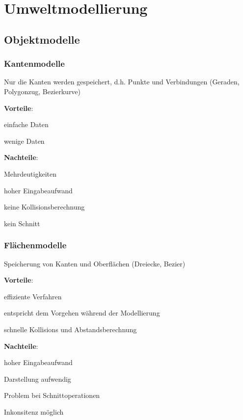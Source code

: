 \chapter{Umweltmodellierung}

\section{Objektmodelle}
\subsection{Kantenmodelle}
\begin{compactitem}
    \item Nur die Kanten werden gespeichert, d.h. Punkte und Verbindungen (Geraden, Polygonzug, Bezierkurve)
    \item \textbf{Vorteile}:
    \begin{compactitem}
        \item einfache Daten
        \item wenige Daten
    \end{compactitem}
    \item \textbf{Nachteile}:
    \begin{compactitem}
        \item Mehrdeutigkeiten
        \item hoher Eingabeaufwand
        \item keine Kollisionsberechnung
        \item kein Schnitt
    \end{compactitem}
\end{compactitem}
\subsection{Flächenmodelle}
\begin{compactitem}
    \item Speicherung von Kanten und Oberflächen (Dreiecke, Bezier)
    \item \textbf{Vorteile}:
    \begin{compactitem}
        \item effiziente Verfahren
        \item entspricht dem Vorgehen während der Modellierung
        \item schnelle Kollisions und Abstandsberechnung
    \end{compactitem}
    \item \textbf{Nachteile}:
    \begin{compactitem}
        \item hoher Eingabeaufwand
        \item Darstellung aufwendig
        \item Problem bei Schnittoperationen
        \item Inkonsitenz möglich
    \end{compactitem}
\end{compactitem}

